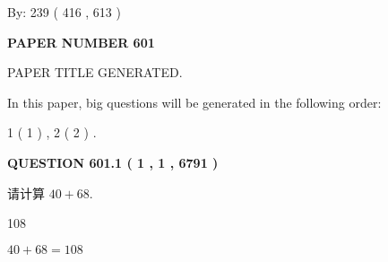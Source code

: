 \documentclass{ctexart}
\begin{document}
   
\hspace{1.0in} By: 
 239 ( 416 ,  613 )
   
   
   
   
\newpage 
\setcounter{page}{ 
   601001 } 
   
   
   
   
 {\textbf{ \Large{ PAPER NUMBER  601  }}}
   
   
\vspace{0.2in}
   
   
   
   
   
   
   
   
 \vspace{0.2in}
 
 
 
 
   
   
 PAPER TITLE GENERATED.
   
   
   
\vspace{0.2in}
   
In this paper, big questions will be generated in the following order: 
   
   
   1 ( 1 )
 ,
   2 ( 2 )
 .
  
\vspace{0.2in}
  
{\textbf{\Large{QUESTION
601.1 
 ( 1 , 1 , 6791 )
}}}
  
  
 
请计算 $ %
40 +  %
68 $.
 
 
 
\noindent{}
 
 

108
 
 
\noindent{}
 
 

 
 
 
\noindent{}
 
 

$ %
40 +  %
68=   %
108$
 
 
\noindent{}
 
 
\end{document}
